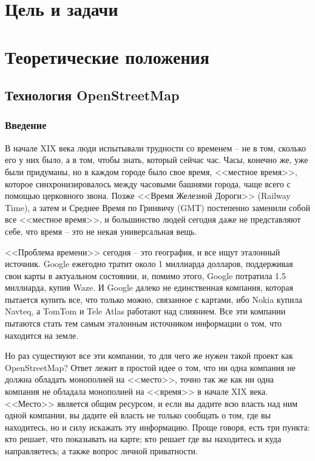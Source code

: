 \chapter{Цель и задачи}
\chapter{Теоретические положения}
\section{Технология OpenStreetMap}
\subsection{Введение}
В начале XIX века люди испытывали трудности со временем -- не в том, сколько 
его у них было, а в том, чтобы знать, который сейчас час. Часы, конечно же, 
уже были придуманы, но в каждом городе было свое время, <<местное время>>, 
которое синхронизировалось между часовыми башнями города, чаще всего с 
помощью церковного звона. Позже <<Время Железной Дороги>> (Railway Time), а 
затем и Среднее Время по Гринвичу (GMT) постепенно заменили собой все 
<<местное время>>, и большинство людей сегодня даже не представляют себе, что 
время -- это не некая универсальная вещь.

<<Проблема времени>> сегодня -- это география, и все ищут эталонный источник. 
Google ежегодно тратит около 1 миллиарда долларов, поддерживая свои карты в 
актуальном состоянии, и, помимо этого, Google потратила 1.5 миллиарда,
купив Waze\cite{waze}. И Google далеко не единственная компания,
которая пытается купить все, что только можно, связанное с картами, ибо 
Nokia купила Navteq\cite{navteq}, а TomTom\cite{tomtom} и 
Tele Atlas\cite{teleatlas} работают над слиянием. Все эти компании пытаются 
стать тем самым эталонным источником информации о том, что находится на земле.

Но раз существуют все эти компании, то для чего же нужен такой проект как 
OpenStreetMap? Ответ лежит в простой идее о том, что ни одна компания не 
должна обладать монополией на <<место>>, точно так же как ни одна компания не 
обладала монополией на <<время>> в начале XIX века. <<Место>> является общим 
ресурсом, и если вы дадите всю власть над ним одной компании, вы дадите ей 
власть не только сообщать о том, где вы находитесь, но и силу искажать эту 
информацию. Проще говоря, есть три пункта: кто решает, что показывать на 
карте; кто решает где вы находитесь и куда направляетесь; а также вопрос 
личной приватности.

